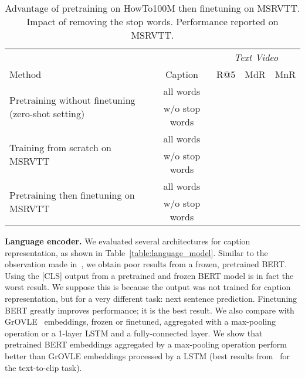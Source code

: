 \documentclass[runningheads]{llncs}
\begin{document}
\begin{table}[t]
\begin{center}
\caption{Advantage of pretraining on HowTo100M then finetuning on MSRVTT. Impact of removing the stop words. Performance reported on MSRVTT.}
\label{table:remove_stop_words}
\scriptsize
\begin{tabular}{l | c | @{\hskip -0.35cm}c @{\hskip -0.35cm}c @{\hskip -0.35cm}c}
\hline
\multicolumn{2}{c}{} & \multicolumn{3}{c}{\textit{Text  Video}}\\
Method & Caption & R@5 & MdR & MnR\\
\hline
\multirow{2}{*}{Pretraining without finetuning (zero-shot setting)} & all words &  &  &  \\
 & w/o stop words &  &  &  \\
\hline

\multirow{2}{*}{Training from scratch on MSRVTT} & all words &  &  &  \\
 & w/o stop words &  &  &  \\
\hline
\multirow{2}{*}{Pretraining then finetuning on MSRVTT} & all words &  &  &  \\
 & w/o stop words &  &  &  \\
\hline
\end{tabular}
\end{center}
\end{table}

\noindent\textbf{Language encoder.} We evaluated several architectures for caption representation, as shown in Table~\ref{table:language_model}. Similar to the observation made in~\cite{burns2019language}, we obtain poor results from a frozen, pretrained BERT. Using the [CLS] output from a pretrained and frozen BERT model is in fact the worst result. We suppose this is because the output was not trained for caption representation, but for a very different task: next sentence prediction. Finetuning BERT greatly improves performance; it is the best result. We also compare with GrOVLE~\cite{burns2019language} embeddings, frozen or finetuned, aggregated with a max-pooling operation or a 1-layer LSTM and a fully-connected layer. We show that  pretrained BERT embeddings aggregated by a max-pooling operation perform better than GrOVLE embeddings processed by a LSTM (best results from~\cite{burns2019language} for the text-to-clip task).
\end{document}
